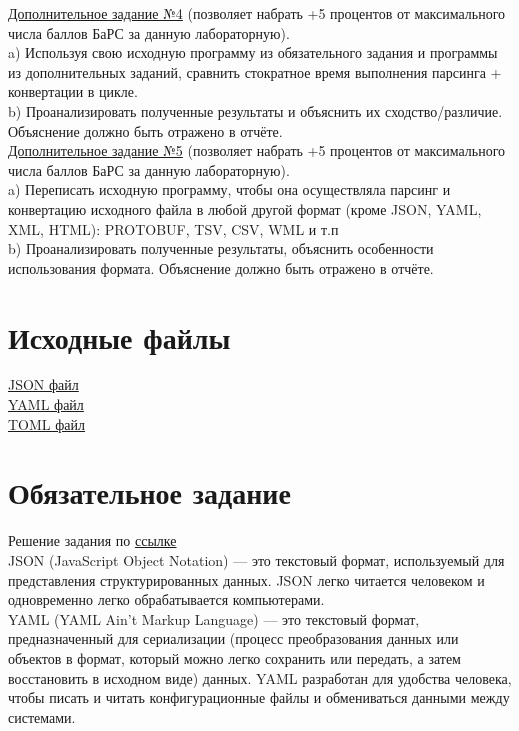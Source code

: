 \underline{Дополнительное задание №4} (позволяет набрать +5 процентов от максимального числа баллов БаРС за данную лабораторную). \\
a) Используя свою исходную программу из обязательного задания и программы из дополнительных заданий, сравнить стократное время выполнения парсинга + конвертации в цикле. \\
b) Проанализировать полученные результаты и объяснить их сходство/различие. Объяснение должно быть отражено в отчёте. \\
\underline{Дополнительное задание №5} (позволяет набрать +5 процентов от максимального числа баллов БаРС за данную лабораторную). \\
a) Переписать исходную программу, чтобы она осуществляла парсинг и конвертацию исходного файла в любой другой формат (кроме JSON, YAML, XML, HTML): PROTOBUF, TSV, CSV, WML и т.п \\
b) Проанализировать полученные результаты, объяснить особенности использования формата. Объяснение должно быть отражено в отчёте.
\section{Исходные файлы}
\href{https://github.com/evgrart/ITMO/blob/main/informatics/labs/lab4/schedule.json}{JSON файл} \\
\href{https://github.com/evgrart/ITMO/blob/main/informatics/labs/lab4/schedule.yaml}{YAML файл} \\
\href{https://github.com/evgrart/ITMO/blob/main/informatics/labs/lab4/schedule.toml}{TOML файл} \\
\section{Обязательное задание}
Решение задания по \href{https://github.com/evgrart/ITMO/blob/main/informatics/labs/lab4/task0.py}{ссылке} \\
JSON (JavaScript Object Notation) — это текстовый формат, используемый для представления структурированных данных. JSON легко читается человеком и одновременно легко обрабатывается компьютерами. \\
YAML (YAML Ain't Markup Language) — это текстовый формат, предназначенный для сериализации (процесс преобразования данных или объектов в формат, который можно легко сохранить или передать, а затем восстановить в исходном виде) данных. YAML разработан для удобства человека, чтобы писать и читать конфигурационные файлы и обмениваться данными между системами.
